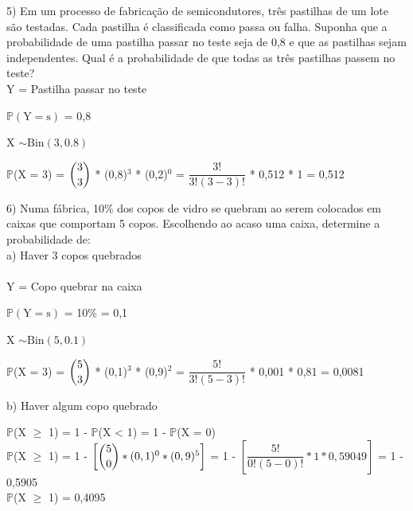 \documentclass[12pt,a4paper,draft]{article}
\begin{document}
	\vspace{1cm}
	5) Em um processo de fabricação de semicondutores, três pastilhas de um lote são testadas. Cada pastilha é classificada como passa ou falha. Suponha que a probabilidade de uma pastilha passar no teste seja de 0,8 e que as pastilhas sejam independentes. Qual é a probabilidade de que todas as três pastilhas passem no teste?
	\vspace{0.5cm}\\
	Y = Pastilha passar no teste
	\begin{center}
		\vspace{1cm}
		$\mathbb{P}\left(\text{Y} = \text{s}\right)$ = 0,8
		\vspace{1cm}\\
	\end{center}
	X $\sim \text{Bin}(3, 0.8)$
	\vspace{1cm}\\
	\begin{center}
		$\mathbb{P}$(X = 3) = $\dbinom{3}{3}$ * (0,8)$^{3}$ * (0,2)$^0$ = $\dfrac{3!}{3!(3-3)!}$ * 0,512 * 1 = 0,512
	\end{center}
	\vspace{1cm}
	6) Numa fábrica, 10\% dos copos de vidro se quebram ao serem colocados em caixas	que comportam 5 copos. Escolhendo ao acaso uma caixa, determine a probabilidade de:\\
	a) Haver 3 copos quebrados\\
	\vspace{0.5cm}\\
	Y = Copo quebrar na caixa
	\begin{center}
		\vspace{1cm}
		$\mathbb{P}\left(\text{Y} = \text{s}\right)$ = 10\% = 0,1
		\vspace{1cm}\\
	\end{center}
	X $\sim \text{Bin}(5, 0.1)$
	\vspace{1cm}\\
	\begin{center}
		$\mathbb{P}$(X = 3) = $\dbinom{5}{3}$ * (0,1)$^{3}$ * (0,9)$^2$ = $\dfrac{5!}{3!(5-3)!}$ * 0,001 * 0,81 = 0,0081
	\end{center}
	\vspace{1cm}
	b) Haver algum copo quebrado
	\vspace{0.5cm}\\
	\begin{center}
		$\mathbb{P}$(X $\geq$ 1) = 1 - $\mathbb{P}$(X < 1) = 1 - $\mathbb{P}$(X = 0)
		\vspace{0.5cm}\\
		$\mathbb{P}$(X $\geq$ 1) = 1 - $\left[\dbinom{5}{0} * (0,1)^{0} * (0,9)^5\right]$ = 1 - $\left[\dfrac{5!}{0!(5-0)!} * 1 * 0,59049\right]$ = 1 - 0,5905
		\vspace{0.5cm}\\
		$\mathbb{P}$(X $\geq$ 1) = 0,4095
	\end{center}	
\end{document}
